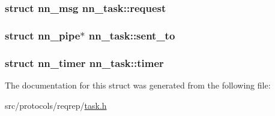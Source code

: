 \subsubsection[{request}]{\setlength{\rightskip}{0pt plus 5cm}struct {\bf nn\+\_\+msg} nn\+\_\+task\+::request}\hypertarget{structnn__task_a0dab7513b2ff280027b3293dcd693655}{}\label{structnn__task_a0dab7513b2ff280027b3293dcd693655}
\subsubsection[{sent\+\_\+to}]{\setlength{\rightskip}{0pt plus 5cm}struct nn\+\_\+pipe$\ast$ nn\+\_\+task\+::sent\+\_\+to}\hypertarget{structnn__task_af4a1558ae1fc15af8a1bda4fad2a31c8}{}\label{structnn__task_af4a1558ae1fc15af8a1bda4fad2a31c8}
\subsubsection[{timer}]{\setlength{\rightskip}{0pt plus 5cm}struct {\bf nn\+\_\+timer} nn\+\_\+task\+::timer}\hypertarget{structnn__task_a835b12a213008ea12a2075efc4180121}{}\label{structnn__task_a835b12a213008ea12a2075efc4180121}


The documentation for this struct was generated from the following file\+:\begin{DoxyCompactItemize}
\item 
src/protocols/reqrep/\hyperlink{task_8h}{task.\+h}\end{DoxyCompactItemize}
